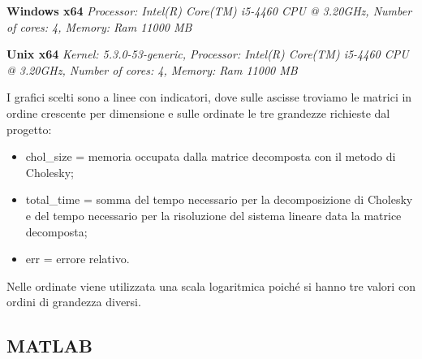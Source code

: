 \documentclass[a4paper,10pt]{article}
\begin{document}
\textbf{Windows x64} 
\textit{Processor: Intel(R) Core(TM) i5-4460  CPU @ 3.20GHz, Number of cores: 4, Memory: Ram 11000 MB\\}

\textbf{Unix x64} 
\textit{Kernel: 5.3.0-53-generic, Processor: Intel(R) Core(TM) i5-4460  CPU @ 3.20GHz, Number of cores: 4, Memory: Ram 11000 MB\\}


I grafici scelti sono a linee con indicatori, dove sulle ascisse troviamo le matrici in ordine crescente per dimensione e sulle ordinate le tre grandezze richieste dal progetto:
\begin{itemize}
\item chol\_size = memoria occupata dalla matrice decomposta con il metodo di Cholesky;
\item total\_time = somma del tempo necessario per la decomposizione di Cholesky e del tempo necessario per la risoluzione del sistema lineare data la matrice decomposta;
\item err = errore relativo.
\end{itemize}
Nelle ordinate viene utilizzata una scala logaritmica poiché si hanno tre valori con ordini di grandezza diversi.
 

\subsection{MATLAB}
\end{document}
